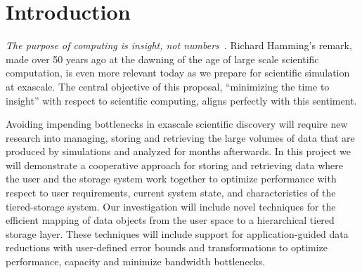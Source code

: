 \section{Introduction} 
\label{sec:introduction}

{\em The purpose of computing is insight, not numbers}~\cite{Hamming:book}.
Richard Hamming's remark, made over 50 years ago at the dawning of the age of
large scale scientific computation, is even more relevant today as we prepare
for scientific simulation at exascale. 
The central objective of this proposal, ``minimizing the time to insight''  
with respect to scientific computing, aligns perfectly with this sentiment. 

Avoiding impending bottlenecks in exascale scientific discovery will require
new research into managing, storing and retrieving the large volumes of data that are 
produced by simulations and analyzed for months afterwards.
%
In this project we will demonstrate a cooperative approach for storing and retrieving  data
where the user and the storage system work together to optimize performance with
respect to user requirements, current system state, and characteristics of the tiered-storage system.
Our investigation will include  novel techniques for the efficient mapping of data objects
from the user space to a hierarchical tiered storage layer. These techniques will
include support for application-guided data reductions with user-defined error bounds
and transformations to optimize performance, capacity and minimize bandwidth bottlenecks.


